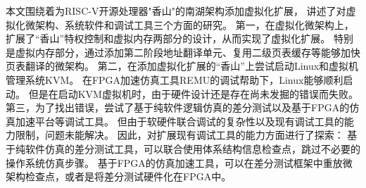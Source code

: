 \begin{conclusions}

本文围绕着为RISC-V开源处理器"香山"的南湖架构添加虚拟化扩展，
讲述了对虚拟化微架构、系统软件和调试工具三个方面的研究。
第一，在虚拟化微架构上，扩展了“香山”特权控制和虚拟内存两部分的设计，从而实现了虚拟化扩展。
特别是虚拟内存部分，通过添加第二阶段地址翻译单元、复用二级页表缓存等能够加快页表翻译的微架构。
第二，在添加虚拟化扩展的“香山”上尝试启动Linux和虚拟机管理系统KVM。
在FPGA加速仿真工具REMU的调试帮助下，Linux能够顺利启动。
但是在启动KVM虚拟机时，由于硬件设计还是存在尚未发掘的错误而失败。
第三，为了找出错误，尝试了基于纯软件逻辑仿真的差分测试以及基于FPGA的仿真加速平台等调试工具。
但由于软硬件联合调试的复杂性以及现有调试工具的能力限制，问题未能解决。
因此，对扩展现有调试工具的能力方面进行了探索：
基于纯软件仿真的差分测试工具，可以联合使用体系结构信息检查点，跳过不必要的操作系统仿真步骤。
基于FPGA的仿真加速工具，可以在差分测试框架中重放微架构检查点，或者是将差分测试硬件化在FPGA中。

\end{conclusions}
